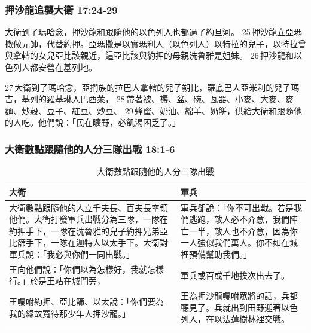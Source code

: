 \subsubsection{押沙龍追襲大衛 17:24-29}
大衛到了瑪哈念，押沙龍和跟隨他的以色列人也都過了約旦河。 25 押沙龍立亞瑪撒做元帥，代替約押。亞瑪撒是以實瑪利人（以色列人）以特拉的兒子，以特拉曾與拿轄的女兒亞比該親近，這亞比該與約押的母親洗魯雅是姐妹。 26 押沙龍和以色列人都安營在基列地。

27 大衛到了瑪哈念，亞捫族的拉巴人拿轄的兒子朔比，羅底巴人亞米利的兒子瑪吉，基列的羅基琳人巴西萊， 28 帶著被、褥、盆、碗、瓦器、小麥、大麥、麥麵、炒穀、豆子、紅豆、炒豆、 29 蜂蜜、奶油、綿羊、奶餅，供給大衛和跟隨他的人吃。他們說：「民在曠野，必飢渴困乏了。」

\subsubsection{大衛數點跟隨他的人分三隊出戰 18:1-6}
\begin{table}[H]
\hspace*{-12mm}
\centering 
\begin{tabular}{p{10.75cm}|p{7.5cm}}\hline\hline
大衛&軍兵\\\hline
大衛數點跟隨他的人立千夫長、百夫長率領他們。大衛打發軍兵出戰分為三隊，一隊在約押手下，一隊在洗魯雅的兒子約押兄弟亞比篩手下，一隊在迦特人以太手下。大衛對軍兵說：「我必與你們一同出戰。」&軍兵卻說：「你不可出戰。若是我們逃跑，敵人必不介意，我們陣亡一半，敵人也不介意，因為你一人強似我們萬人。你不如在城裡預備幫助我們。」 \\\hline
王向他們說：「你們以為怎樣好，我就怎樣行。」於是王站在城門旁，&軍兵或百或千地挨次出去了。 \\\hline
王囑咐約押、亞比篩、以太說：「你們要為我的緣故寬待那少年人押沙龍。」&王為押沙龍囑咐眾將的話，兵都聽見了。兵就出到田野迎著以色列人，在以法蓮樹林裡交戰。\\\hline
\end{tabular}
\caption{大衛數點跟隨他的人分三隊出戰}
\end{table}


